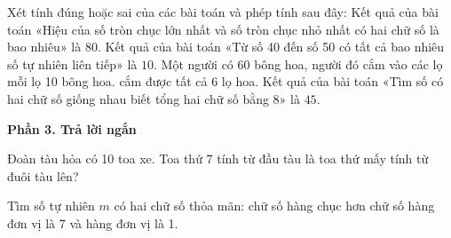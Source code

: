\begin{ex} %
Xét tính đúng hoặc sai của các bài toán và phép tính sau đây:
\choiceTF
{\True Kết quả của bài toán «Hiệu của số tròn chục lớn nhất và số tròn chục nhỏ nhất có hai chữ số là bao nhiêu» là $80$.}
{Kết quả của bài toán «Từ số 40 đến số 50 có tất cả bao nhiêu số tự nhiên liên tiếp» là $10$.}
{\True Một người có 60 bông hoa, người đó cắm vào các lọ mỗi lọ 10 bông hoa. cắm được tất cả $6$ lọ hoa.}
{Kết quả của bài toán «Tìm số có hai chữ số giống nhau biết tổng hai chữ số bằng 8» là $45$.}
\end{ex}

\textbf{Phần 3. Trả lời ngắn}

\begin{ex} %
Đoàn tàu hỏa có 10 toa xe. Toa thứ 7 tính từ đầu tàu là toa thứ mấy tính từ đuôi tàu lên?
\end{ex}

\begin{ex} %
Tìm số tự nhiên $m$ có hai chữ số thỏa mãn: chữ số hàng chục hơn chữ số hàng đơn vị là 7 và hàng đơn vị là 1.
\end{ex}

